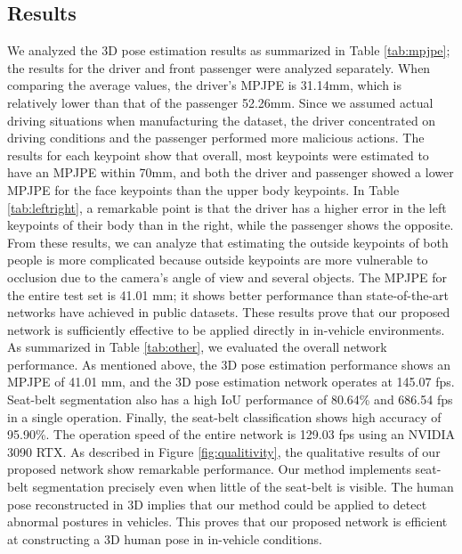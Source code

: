 \documentclass[letterpaper]{article} %
\begin{document}
\subsection{Results}
We analyzed the 3D pose estimation results as summarized in Table \ref{tab:mpjpe}; the results for the driver and front passenger were analyzed separately. When comparing the average values, the driver's MPJPE is 31.14mm, which is relatively lower than that of the passenger 52.26mm. Since we assumed actual driving situations when manufacturing the dataset, the driver concentrated on driving conditions and the passenger performed more malicious actions. The results for each keypoint show that overall, most keypoints were estimated to have an MPJPE within 70mm, and both the driver and passenger showed a lower MPJPE for the face keypoints than the upper body keypoints. In Table \ref{tab:leftright}, a remarkable point is that the driver has a higher error in the left keypoints of their body than in the right, while the passenger shows the opposite. From these results, we can analyze that estimating the outside keypoints of both people is more complicated because outside keypoints are more vulnerable to occlusion due to the camera's angle of view and several objects. The MPJPE for the entire test set is 41.01 mm; it shows better performance than state-of-the-art networks have achieved in public datasets. These results prove that our proposed network is sufficiently effective to be applied directly in in-vehicle environments.  As summarized in Table \ref{tab:other}, we evaluated the overall network performance. As mentioned above, the 3D pose estimation performance shows an MPJPE of 41.01 mm, and the 3D pose estimation network operates at 145.07 fps. Seat-belt segmentation also has a high IoU performance of 80.64\% and 686.54 fps in a single operation. Finally, the seat-belt classification shows high accuracy of 95.90\%. The operation speed of the entire network is 129.03 fps using an NVIDIA 3090 RTX. As described in Figure \ref{fig:qualitivity}, the qualitative results of our proposed network show remarkable performance. Our method implements seat-belt segmentation precisely even when little of the seat-belt is visible. The human pose reconstructed in 3D implies that our method could be applied to detect abnormal postures in vehicles. This proves that our proposed network is efficient at constructing a 3D human pose in in-vehicle conditions.

\vspace{-0.89mm}
\vspace{-1.58mm}
\end{document}
